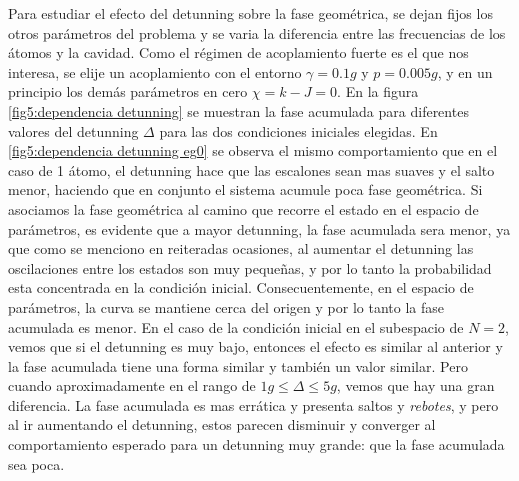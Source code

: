 Para estudiar el efecto del detunning sobre la fase geométrica, se dejan fijos los otros parámetros del problema y se varia la diferencia entre las frecuencias de los átomos y la cavidad. Como el régimen de acoplamiento fuerte es el que nos interesa, se elije un acoplamiento con el entorno $\gamma=0.1g$ y $p=0.005g$, y en un principio los demás parámetros en cero $\chi=k-J=0$. En la figura \ref{fig5:dependencia detunning} se muestran la fase acumulada para diferentes valores del detunning $\Delta$ para las dos condiciones iniciales elegidas. En \ref{fig5:dependencia detunning eg0} se observa el mismo comportamiento que en el caso de 1 átomo, el detunning hace que las escalones sean mas suaves y el salto menor, haciendo que en conjunto el sistema acumule poca fase geométrica. Si asociamos la fase geométrica al camino que recorre el estado en el espacio de parámetros, es evidente que a mayor detunning, la fase acumulada sera menor, ya que como se menciono en reiteradas ocasiones, al aumentar el detunning las oscilaciones entre los estados son muy pequeñas, y por lo tanto la probabilidad esta concentrada en la condición inicial. Consecuentemente, en el espacio de parámetros, la curva se mantiene cerca del origen y por lo tanto la fase acumulada es menor. En el caso de la condición inicial en el subespacio de $N=2$, vemos que si el detunning es muy bajo, entonces el efecto es similar al anterior y la fase acumulada tiene una forma similar y también un valor similar. Pero cuando aproximadamente en el rango de  $1g \leq \Delta \leq 5g$, vemos que hay una gran diferencia. La fase acumulada es mas errática y presenta saltos y \textit{rebotes}, y pero al ir aumentando el detunning, estos parecen disminuir y converger al comportamiento esperado para un detunning muy grande: que la fase acumulada sea poca.
